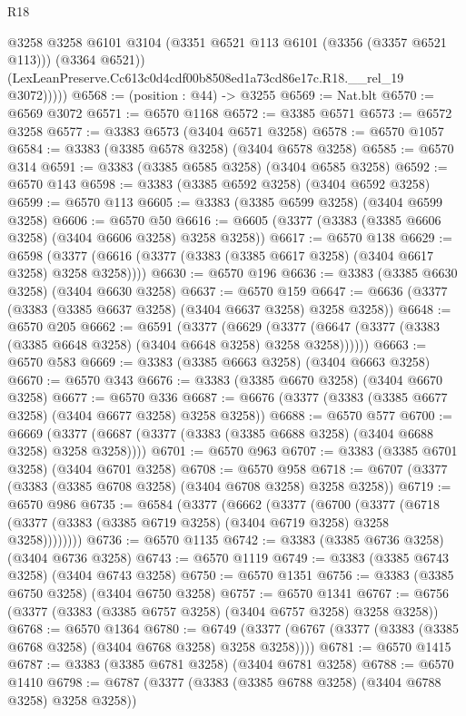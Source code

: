 \begin{lexlean}{R18}
\begin{coremodule}
              @3258
              @3258
              @6101
              @3104
              (@3351 @6521 @113 @6101 (@3356 (@3357 @6521 @113)))
              (@3364 @6521))
            (LexLeanPreserve.Cc613c0d4cdf00b8508ed1a73cd86e17c.R18.__rel_19 @3072)))))
@6568 := (position : @44) -> @3255
@6569 := Nat.blt
@6570 := @6569 @3072
@6571 := @6570 @1168
@6572 := @3385 @6571
@6573 := @6572 @3258
@6577 := @3383 @6573 (@3404 @6571 @3258)
@6578 := @6570 @1057
@6584 := @3383 (@3385 @6578 @3258) (@3404 @6578 @3258)
@6585 := @6570 @314
@6591 := @3383 (@3385 @6585 @3258) (@3404 @6585 @3258)
@6592 := @6570 @143
@6598 := @3383 (@3385 @6592 @3258) (@3404 @6592 @3258)
@6599 := @6570 @113
@6605 := @3383 (@3385 @6599 @3258) (@3404 @6599 @3258)
@6606 := @6570 @50
@6616 := @6605 (@3377 (@3383 (@3385 @6606 @3258) (@3404 @6606 @3258) @3258 @3258))
@6617 := @6570 @138
@6629 := @6598 (@3377 (@6616 (@3377 (@3383 (@3385 @6617 @3258) (@3404 @6617 @3258) @3258 @3258))))
@6630 := @6570 @196
@6636 := @3383 (@3385 @6630 @3258) (@3404 @6630 @3258)
@6637 := @6570 @159
@6647 := @6636 (@3377 (@3383 (@3385 @6637 @3258) (@3404 @6637 @3258) @3258 @3258))
@6648 := @6570 @205
@6662 := @6591
    (@3377
      (@6629 (@3377 (@6647 (@3377 (@3383 (@3385 @6648 @3258) (@3404 @6648 @3258) @3258 @3258))))))
@6663 := @6570 @583
@6669 := @3383 (@3385 @6663 @3258) (@3404 @6663 @3258)
@6670 := @6570 @343
@6676 := @3383 (@3385 @6670 @3258) (@3404 @6670 @3258)
@6677 := @6570 @336
@6687 := @6676 (@3377 (@3383 (@3385 @6677 @3258) (@3404 @6677 @3258) @3258 @3258))
@6688 := @6570 @577
@6700 := @6669 (@3377 (@6687 (@3377 (@3383 (@3385 @6688 @3258) (@3404 @6688 @3258) @3258 @3258))))
@6701 := @6570 @963
@6707 := @3383 (@3385 @6701 @3258) (@3404 @6701 @3258)
@6708 := @6570 @958
@6718 := @6707 (@3377 (@3383 (@3385 @6708 @3258) (@3404 @6708 @3258) @3258 @3258))
@6719 := @6570 @986
@6735 := @6584
    (@3377
      (@6662
        (@3377
          (@6700
            (@3377 (@6718 (@3377 (@3383 (@3385 @6719 @3258) (@3404 @6719 @3258) @3258 @3258))))))))
@6736 := @6570 @1135
@6742 := @3383 (@3385 @6736 @3258) (@3404 @6736 @3258)
@6743 := @6570 @1119
@6749 := @3383 (@3385 @6743 @3258) (@3404 @6743 @3258)
@6750 := @6570 @1351
@6756 := @3383 (@3385 @6750 @3258) (@3404 @6750 @3258)
@6757 := @6570 @1341
@6767 := @6756 (@3377 (@3383 (@3385 @6757 @3258) (@3404 @6757 @3258) @3258 @3258))
@6768 := @6570 @1364
@6780 := @6749 (@3377 (@6767 (@3377 (@3383 (@3385 @6768 @3258) (@3404 @6768 @3258) @3258 @3258))))
@6781 := @6570 @1415
@6787 := @3383 (@3385 @6781 @3258) (@3404 @6781 @3258)
@6788 := @6570 @1410
@6798 := @6787 (@3377 (@3383 (@3385 @6788 @3258) (@3404 @6788 @3258) @3258 @3258))

\end{coremodule}
\end{lexlean}
